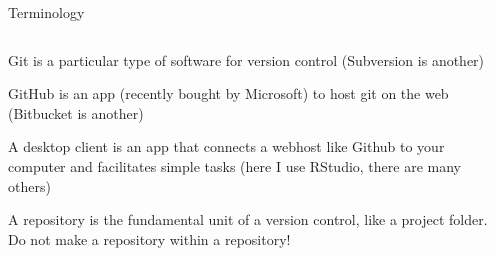 \documentclass[ignorenonframetext,notes, 10pt, aspectratio=169]{beamer}
\begin{document}
\begin{frame}{Terminology}
\begin{columns}[T]
\begin{column}{0.5\textwidth}
\begin{wideitemize}
\item \alert{Git} is a particular type of software for version control (Subversion is another)
\item \alert{GitHub} is an app (recently bought by Microsoft) to host git on the web (Bitbucket is another)
\item A \alert{desktop client} is an app that connects a webhost like Github to your computer and facilitates simple tasks (here I use \alert{RStudio}, there are many others)
\item A \alert{repository} is the fundamental unit of a version control, like a project folder. \pause Do not make a repository within a repository! 
\end{wideitemize}
\end{column}
\begin{column}{0.5\textwidth}
\end{column}
\end{columns}
\end{frame}



\end{document}

